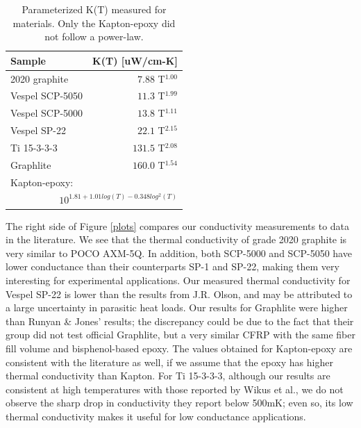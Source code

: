 \documentclass[final]{svjour2}
\begin{document}
\begin{table}
\centering
\small
\begin{threeparttable}
\begin{tabular}{lr}
\toprule
Sample & K(T) [uW/cm-K] \\
\midrule
2020 graphite & $7.88$ T$^{1.00}$ \\
Vespel SCP-5050 & $11.3$ T$^{1.99}$ \\
Vespel SCP-5000 & $13.8$ T$^{1.11}$ \\
Vespel SP-22 & $22.1$ T$^{2.15}$ \\
Ti 15-3-3-3 & $131.5$ T$^{2.08}$ \\
Graphlite & $160.0$ T$^{1.54}$ \\
Kapton-epoxy: & \\
\multicolumn{2}{r}{$10^{1.81 + 1.01log(T) - 0.348log^2(T)}$} \\
\bottomrule
\end{tabular}
\caption{{\small Parameterized K(T) measured for materials. Only the Kapton-epoxy did not follow a power-law.}}
\label{cond_table}
\end{threeparttable}
\end{table}

The right side of Figure \ref{plots} compares our conductivity measurements to data in the literature. We see that the thermal conductivity of grade 2020 graphite is very similar to POCO AXM-5Q. In addition, both SCP-5000 and SCP-5050 have lower conductance than their counterparts SP-1 and SP-22, making them very interesting for experimental applications. Our measured thermal conductivity for Vespel SP-22 is lower than the results from J.R. Olson\cite{Olson1993}, and may be attributed to a large uncertainty in parasitic heat loads. Our results for Graphlite were higher than Runyan \& Jones' results\cite{Runyan2008}; the discrepancy could be due to the fact that their group did not test official Graphlite, but a very similar CFRP with the same fiber fill volume and bisphenol-based epoxy.  The values obtained for Kapton-epoxy are consistent with the literature as well, if we assume that the epoxy has higher thermal conductivity than Kapton. For Ti 15-3-3-3, although our results are consistent at high temperatures with those reported by Wikus et al.\cite{Wikus2010}, we do not observe the sharp drop in conductivity they report below 500mK; even so, its low thermal conductivity makes it useful for low conductance applications.
\end{document}
